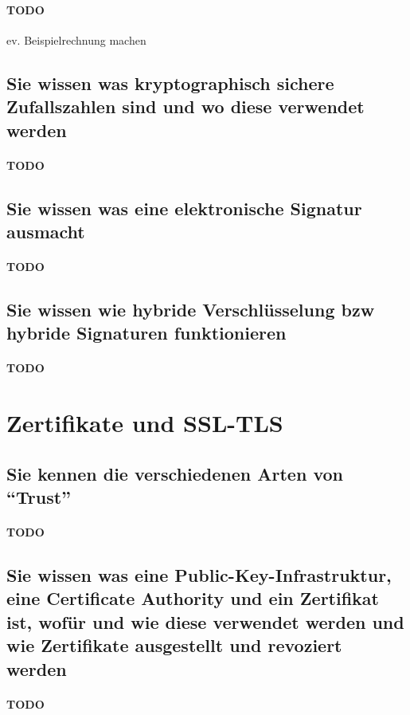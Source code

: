 \documentclass[10pt,a4paper]{article}
\begin{document}
\paragraph*{TODO}ev. Beispielrechnung machen
\subsection*{Sie wissen was kryptographisch sichere Zufallszahlen sind und wo diese verwendet werden}
\paragraph*{TODO}
\subsection*{Sie wissen was eine elektronische Signatur ausmacht}
\paragraph*{TODO}
\subsection*{Sie wissen wie hybride Verschlüsselung bzw hybride Signaturen funktionieren}
\paragraph*{TODO}


\section{Zertifikate und SSL-TLS}
\subsection*{Sie kennen die verschiedenen Arten von "`Trust"'}
\paragraph*{TODO}
\subsection*{Sie wissen was eine Public-Key-Infrastruktur, eine Certificate Authority und ein Zertifikat ist, wofür und wie diese verwendet werden und wie Zertifikate ausgestellt und revoziert werden}
\paragraph*{TODO}
\end{document}
